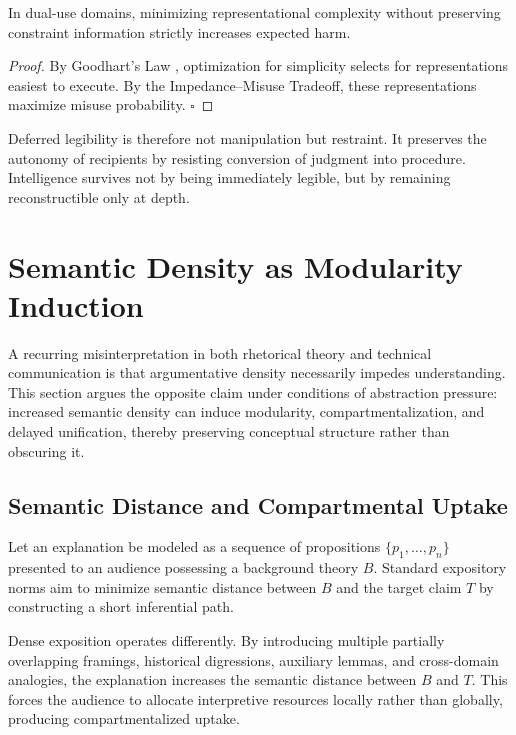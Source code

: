 \begin{lemma}
In dual-use domains, minimizing representational complexity without preserving constraint information strictly increases expected harm.
\end{lemma}

\begin{proof}
By Goodhart’s Law \cite{goodhart1975}, optimization for simplicity selects for representations easiest to execute. By the Impedance--Misuse Tradeoff, these representations maximize misuse probability. \hfill $\square$
\end{proof}

Deferred legibility is therefore not manipulation but restraint. It preserves the autonomy of recipients by resisting conversion of judgment into procedure. Intelligence survives not by being immediately legible, but by remaining reconstructible only at depth.

\section{Semantic Density as Modularity Induction}

A recurring misinterpretation in both rhetorical theory and technical communication is that argumentative density necessarily impedes understanding. This section argues the opposite claim under conditions of abstraction pressure: increased semantic density can induce modularity, compartmentalization, and delayed unification, thereby preserving conceptual structure rather than obscuring it.

\subsection{Semantic Distance and Compartmental Uptake}

Let an explanation be modeled as a sequence of propositions $\{p_1, \dots, p_n\}$ presented to an audience possessing a background theory $B$. Standard expository norms aim to minimize semantic distance between $B$ and the target claim $T$ by constructing a short inferential path.

Dense exposition operates differently. By introducing multiple partially overlapping framings, historical digressions, auxiliary lemmas, and cross-domain analogies, the explanation increases the semantic distance between $B$ and $T$. This forces the audience to allocate interpretive resources locally rather than globally, producing compartmentalized uptake.

